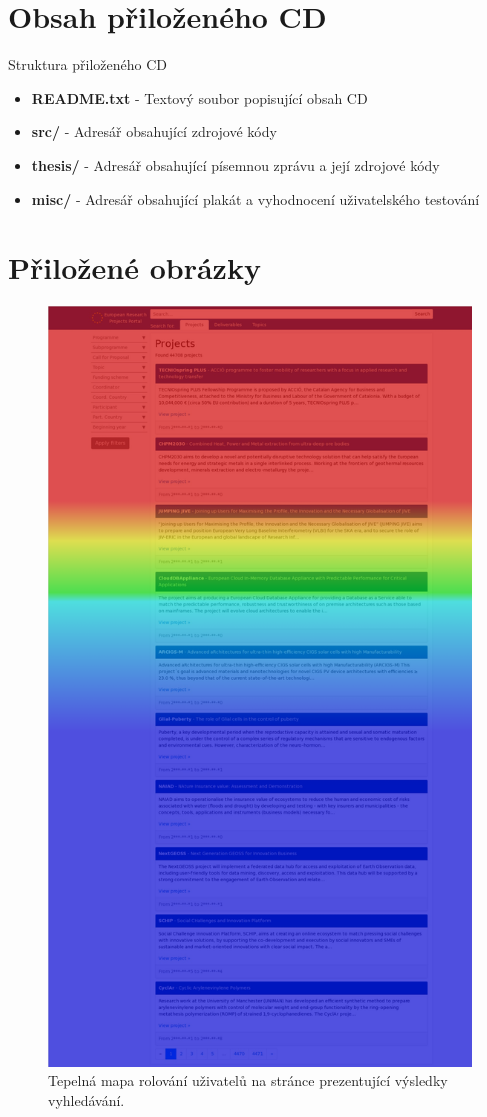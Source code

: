 \chapter{Obsah přiloženého CD}
Struktura přiloženého CD
\begin{itemize}
\item \textbf{README.txt} - Textový soubor popisující obsah CD
\item \textbf{src/} - Adresář obsahující zdrojové kódy
\item \textbf{thesis/} - Adresář obsahující písemnou zprávu a její zdrojové kódy
\item \textbf{misc/} - Adresář obsahující plakát a vyhodnocení uživatelského testování
\end{itemize}

\chapter{Přiložené obrázky}
\begin{figure}[H]
	\centering
	\includegraphics[height=\textheight-8cm]{obrazky-figures/heatmap-scroll.png}
	\caption{Tepelná mapa rolování uživatelů na stránce prezentující výsledky vyhledávání.}
    \label{img:heatmap-scroll}
\end{figure}